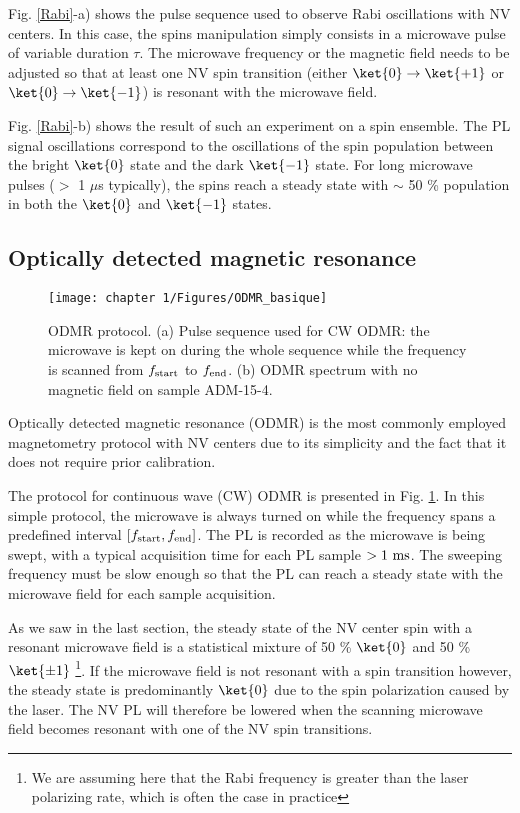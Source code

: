 \documentclass[a4paper,11pt]{report}
\begin{document}
\begin{refsection}
Fig. \ref{Rabi}-a) shows the pulse sequence used to observe Rabi oscillations with NV centers. In this case, the spins manipulation simply consists in a microwave pulse of variable duration $\tau$. The microwave frequency or the magnetic field needs to be adjusted so that at least one NV spin transition (either $\ket{0} \to \ket{+1}$ or $\ket{0} \to \ket{-1}$) is resonant with the microwave field. 

Fig. \ref{Rabi}-b) shows the result of such an experiment on a spin ensemble. The PL signal oscillations correspond to the oscillations of the spin population between the bright $\ket{0}$ state and the dark $\ket{-1}$ state. For long microwave pulses ($>$ 1 $\mu$s typically), the spins reach a steady state with  $\sim$ 50 \% population in both the $\ket{0}$ and $\ket{-1}$ states.


\subsection{Optically detected magnetic resonance}
\begin{figure}[h!]
\centering
\texttt{[image: chapter 1/Figures/ODMR\_basique]}
\caption{ODMR protocol. (a) Pulse sequence used for CW ODMR: the microwave is kept on during the whole sequence while the frequency is scanned from $f_{\rm start}$ to $f_{\rm end}$. (b) ODMR spectrum with no magnetic field on sample ADM-15-4.}
\label{ODMR basique}
\end{figure}

Optically detected magnetic resonance (ODMR) is the most commonly employed magnetometry protocol with NV centers due to its simplicity and the fact that it does not require prior calibration.

The protocol for continuous wave (CW) ODMR is presented in Fig. \ref{ODMR basique}. In this simple protocol, the microwave is always turned on while the frequency spans a predefined interval $[f_{\rm start}, f_{\rm end}]$. The PL is recorded as the microwave is being swept, with a typical acquisition time for each PL sample $> 1\ \rm ms$. The sweeping frequency must be slow enough so that the PL can reach a steady state with the microwave field for each sample acquisition. 

As we saw in the last section, the steady state of the NV center spin with a resonant microwave field is a statistical mixture of 50 \% $\ket{0}$ and 50 \% $\ket{\pm 1}$ \footnote{We are assuming here that the Rabi frequency is greater than the laser polarizing rate, which is often the case in practice}. If the microwave field is not resonant with a spin transition however, the steady state is predominantly $\ket{0}$ due to the spin polarization caused by the laser. The NV PL will therefore be lowered when the scanning microwave field becomes resonant with one of the NV spin transitions. 


\end{refsection}
\end{document}
